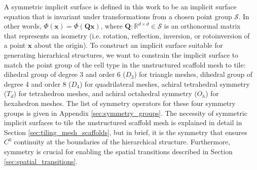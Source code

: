 \documentclass[acmtog]{acmart}
\begin{document}
A symmetric implicit surface is defined in this work to be an implicit surface equation that is invariant under transformations from a chosen point group $\mathcal{S}$. In other words, $\Phi(\mathbf{x}) = \Phi(\mathbf{Q} \mathbf{x})$, where $\mathbf{Q}: \mathbb{R}^{d \times d} \in \mathcal{S}$ is an orthonormal matrix that represents an isometry (i.e. rotation, reflection, inversion, or rotoinversion of a point $\mathbf{x}$ about the origin). To construct an implicit surface suitable for generating hierarhical structures, we want to constrain the implicit surface to match the point group of the cell type in the unstructured scaffold mesh to tile: dihedral group of degree 3 and order 6 ($D_3$) for triangle meshes, dihedral group of degree 4 and order 8 ($D_4$) for quadrilateral meshes, achiral tetrahedral symmetry ($T_d$) for tetrahedron meshes, and achiral octahedral symmetry ($O_h$) for hexahedron meshes. The list of symmetry operators for these four symmetry groups is given in Appendix \ref{sec:symmetry_groups}. The necessity of symmetric implicit surfaces to tile the unstructured scaffold mesh is explained in detail in Section \ref{sec:tiling_mesh_scaffolds}, but in brief, it is the symmetry that ensures $C^0$ continuity at the boundaries of the hierarchical structure. Furthermore, symmetry is crucial for enabling the spatial transitions described in Section \ref{sec:spatial_transitions}.
\end{document}
